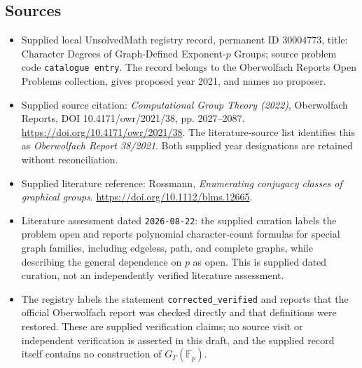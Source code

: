 \documentclass[11pt]{article}
\newcommand{\F}{\mathbb{F}}
\begin{document}
\subsection{Sources}
\begin{itemize}
\item Supplied local UnsolvedMath registry record, permanent ID \(30004773\), title: Character Degrees of Graph-Defined Exponent-\(p\) Groups; source problem code \texttt{catalogue entry}. The record belongs to the Oberwolfach Reports Open Problems collection, gives proposed year 2021, and names no proposer.
\item Supplied source citation: \emph{Computational Group Theory (2022)}, Oberwolfach Reports, DOI 10.4171/owr/2021/38, pp. 2027--2087. \url{https://doi.org/10.4171/owr/2021/38}. The literature-source list identifies this as \emph{Oberwolfach Report 38/2021}. Both supplied year designations are retained without reconciliation.
\item Supplied literature reference: Rossmann, \emph{Enumerating conjugacy classes of graphical groups}. \url{https://doi.org/10.1112/blms.12665}.
\item Literature assessment dated \texttt{2026-08-22}: the supplied curation labels the problem open and reports polynomial character-count formulas for special graph families, including edgeless, path, and complete graphs, while describing the general dependence on \(p\) as open. This is supplied dated curation, not an independently verified literature assessment.
\item The registry labels the statement \texttt{corrected\_verified} and reports that the official Oberwolfach report was checked directly and that definitions were restored. These are supplied verification claims; no source visit or independent verification is asserted in this draft, and the supplied record itself contains no construction of \(G_\Gamma(\F_p)\).
\end{itemize}
\end{document}
